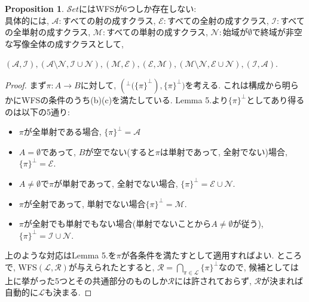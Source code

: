 \documentclass[. /main]{subfiles}
\theoremstyle{definition}
\newtheorem{prop}[theo]{Proposition}
\begin{document}
\begin{prop}
$\mathcal{S}et$にはWFSが6つしか存在しない:\\
具体的には, $\mathcal{A}:$すべての射の成すクラス, $\mathcal{E}:$すべての全射の成すクラス, $\mathcal{I}:$すべての全単射の成すクラス, $\mathcal{M}:$すべての単射の成すクラス, $\mathcal{N}:$始域が$\emptyset$で終域が非空な写像全体の成すクラスとして, 
\begin{center} $(\mathcal{A},  \mathcal{I}),  (\mathcal{A} \setminus \mathcal{N},  \mathcal{I} \cup \mathcal{N}),  (\mathcal{M},  \mathcal{E}),  (\mathcal{E},  \mathcal{M}),  (\mathcal{M} \setminus \mathcal{N},  \mathcal{E} \cup \mathcal{N}),  (\mathcal{I},  \mathcal{A})$.
\end{center}
\end{prop}
\begin{proof}
まず$\pi \colon A \to B$に対して, $({{}^{\perp}(\{\pi\}}^{\perp}),  {\{\pi\}}^{\perp})$を考える. これは構成から明らかにWFSの条件のうち(b)(c)を満たしている. Lemma 5.より${\{\pi\}}^{\perp}$としてあり得るのは以下の5通り:
\begin{itemize}
\item $\pi$が全単射である場合, ${\{\pi\}}^{\perp}=\mathcal{A}$
\item $A=\emptyset$であって, $B$が空でない(すると$\pi$は単射であって, 全射でない)場合, ${\{\pi\}}^{\perp}=\mathcal{E}$. 
\item $A \neq \emptyset$で$\pi$が単射であって, 全射でない場合, ${\{\pi\}}^{\perp}=\mathcal{E} \cup \mathcal{N}$. 
\item $\pi$が全射であって, 単射でない場合${\{\pi\}}^{\perp}=\mathcal{M}$. 
\item $\pi$が全射でも単射でもない場合(単射でないことから$A \neq \emptyset$が従う), ${\{\pi\}}^{\perp}=\mathcal{I} \cup \mathcal{N}$. 
\end{itemize}
上のような対応はLemma 5.を$\pi$が各条件を満たすとして適用すればよい. ところで, WFS$(\mathcal{L},  \mathcal{R})$が与えられたとすると, $\mathcal{R}={\bigcap}_{\pi \in \mathcal{L}} {\{\pi\}}^{\perp}$なので, 候補としては上に挙がった5つとその共通部分のものしか$\mathcal{R}$には許されておらず, $\mathcal{R}$が決まれば自動的に$\mathcal{L}$も決まる. 


\end{proof}
\end{document}
